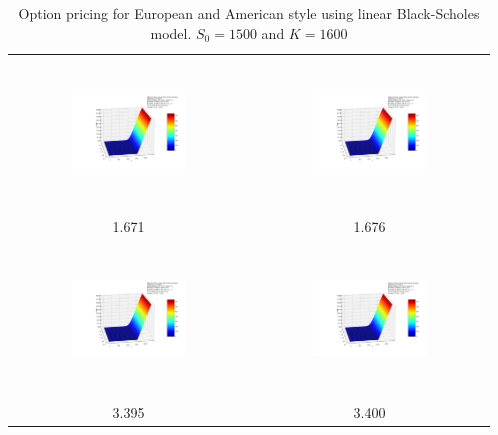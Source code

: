 \documentclass[10pt,a4paper]{article}
\begin{document}
\begin{table}
\begin{tabular}{|c|c|}
		\hline
		\includegraphics[width=0.5\textwidth, height=40mm]{Black-Scholes_K1600.0_sigma0.2_r0.03_T0.9_linear_european.png}
		& \includegraphics[width=0.5\textwidth, height=40mm]{Black-Scholes_K1600.0_sigma0.2_r0.03_T0.9_linear_american.png} \\
		1.671 &  1.676\\
		\hline
		\includegraphics[width=0.5\textwidth, height=40mm]{Black-Scholes_K1600.0_sigma0.25_r0.02_T0.9_linear_european.png}
		& \includegraphics[width=0.5\textwidth, height=40mm]{Black-Scholes_K1600.0_sigma0.25_r0.02_T0.9_linear_american.png} \\
		3.395 & 3.400 \\ 
		\hline
	\end{tabular}
	\caption{Option pricing for European and American style using  linear Black-Scholes model. $S_0=1500$ and $K=1600$}\label{tbl:linear}	
		\end{table}
	
\end{document}
